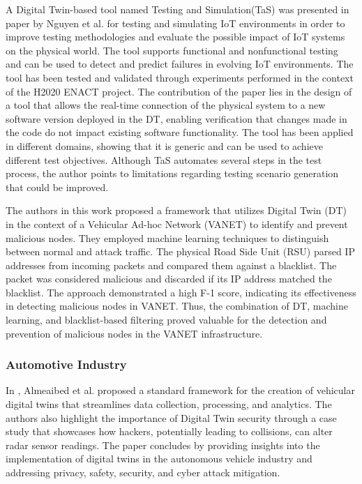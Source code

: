 A Digital Twin-based tool named Testing and Simulation(TaS) was presented in\cite{luongnguyenDigitalTwinIoT2022} paper by Nguyen et al. for testing and simulating IoT environments in order to improve testing methodologies and evaluate the possible impact of IoT systems on the physical world. The tool supports functional and nonfunctional testing and can be used to detect and predict failures in evolving IoT environments. The tool has been tested and validated through experiments performed in the context of the H2020 ENACT project. The contribution of the paper lies in the design of a tool that allows the real-time connection of the physical system to a new software version deployed in the DT, enabling verification that changes made in the code do not impact existing software functionality. The tool has been applied in different domains, showing that it is generic and can be used to achieve different test objectives. Although TaS automates several steps in the test process, the author points to limitations regarding testing scenario generation that could be improved.

The authors in this \cite{aryaDetectionMaliciousNode2023a} work proposed a framework that utilizes Digital Twin (DT) in the context of a Vehicular Ad-hoc Network (VANET) to identify and prevent malicious nodes. They employed machine learning techniques to distinguish between normal and attack traffic. The physical Road Side Unit (RSU) parsed IP addresses from incoming packets and compared them against a blacklist. The packet was considered malicious and discarded if its IP address matched the blacklist. The approach demonstrated a high F-1 score, indicating its effectiveness in detecting malicious nodes in VANET. Thus, the combination of DT, machine learning, and blacklist-based filtering proved valuable for the detection and prevention of malicious nodes in the VANET infrastructure.








\subsubsection*{Automotive Industry}
In \cite{almeaibedDigitalTwinAnalysis2021}, Almeaibed et al. proposed a standard framework for the creation of vehicular digital twins that streamlines data collection, processing, and analytics. The authors also highlight the importance of Digital Twin security through a case study that showcases how hackers, potentially leading to collisions, can alter radar sensor readings. The paper concludes by providing insights into the implementation of digital twins in the autonomous vehicle industry and addressing privacy, safety, security, and cyber attack mitigation.

